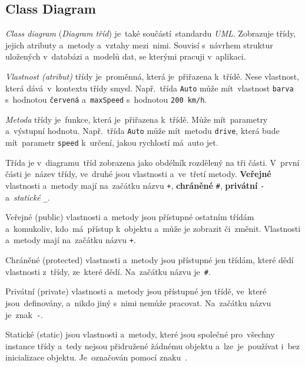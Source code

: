 \documentclass[11pt,a4paper]{report}
\begin{document}
            \subsection{Class Diagram}
                \emph{Class diagram} (\emph{Diagram tříd}) je~také součástí~standardu \emph{UML}. Zobrazuje třídy, jejich atributy a~metody a~vztahy mezi~nimi. Souvisí s~návrhem struktur uložených v~databázi a~modelů dat, se kterými pracuji v~aplikaci.

                \emph{Vlastnost (atribut)} třídy je~proměnná, která je~přiřazena k~třídě. Nese vlastnost, která dává~v~kontextu třídy smysl. Např.~třída \texttt{Auto} může mít~vlastnost \texttt{barva} s~hodnotou \texttt{červená} a~\texttt{maxSpeed} s~hodnotou \texttt{200\,km/h}.

                \emph{Metoda} třídy je~funkce, která je~přiřazena k~třídě. Může mít~parametry a~výstupní hodnotu. Např.~třída \texttt{Auto} může mít~metodu \texttt{drive}, která bude mít~parametr \texttt{speed} k~určení, jakou rychlostí má~auto jet.
                
                Třída je v~diagramu~tříd zobrazena jako obdélník rozdělený na tři části. V~první části je~název třídy, ve~druhé jsou vlastnosti a~ve~třetí metody. \textbf{Veřejné} vlastnosti a~metody mají na~začátku názvu \texttt{+}, \textbf{chráněné} \texttt{\#}, \textbf{privátní} \texttt{-} a~\emph{statické} \texttt{\_}.

                \begin{description}
                    \item{Veřejné (public)} vlastnosti a~metody jsou přístupné ostatním třídám a~komukoliv, kdo~má~přístup k~objektu a~může je zobrazit či~změnit. Vlastnosti a~metody mají na~začátku názvu \texttt{+}.

                    \item{Chráněné (protected)} vlastnosti a~metody jsou přístupné jen třídám, které dědí vlastnosti z~třídy, ze~které dědí. Na~začátku názvu je~\texttt{\#}.
                
                    \item{Privátní (private)} vlastnosti a~metody jsou přístupné jen třídě, ve~které jsou~definovány, a~nikdo jiný s~nimi nemůže pracovat. Na~začátku názvu je~znak~\texttt{-}.
                
                    \item{Statické (static)} jsou vlastnosti a~metody, které jsou společné pro~všechny instance třídy a~tedy nejsou přidružené žádnému objektu a~lze~je~používat i~bez inicializace objektu. Je~označován pomocí znaku~\texttt{\textunderscore}.
                \end{description}
                
\end{document}
